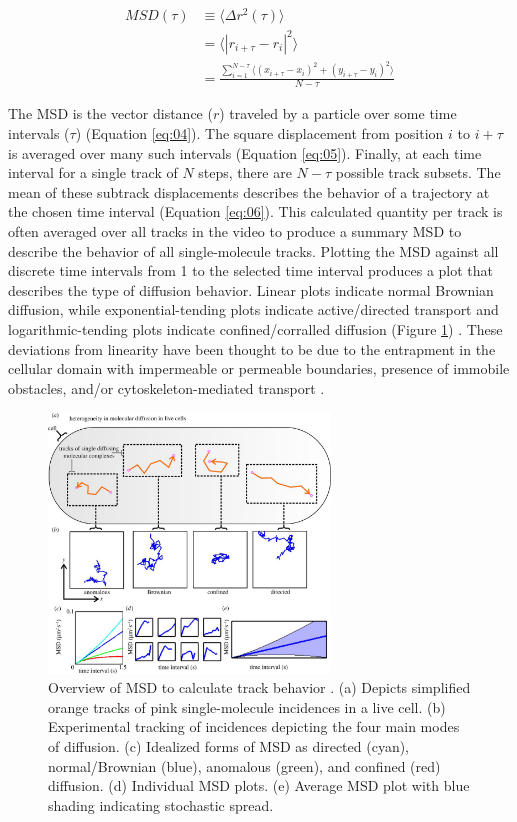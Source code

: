 \documentclass{bioinfo}
\begin{document}
\begin{align}
    MSD(\tau) & \equiv \Big \langle \Delta r^2(\tau) \Big \rangle \label{eq:04} \\ 
    & =  \Big \langle |r_{i+\tau} - r_i|^2 \Big \rangle \label{eq:05} \\ 
    & = \frac{\sum_{i=1}^{N-\tau}\big \langle (x_{i+\tau} - x_i)^2  + (y_{i+\tau} - y_i)^2 \big \rangle}{N - \tau} \label{eq:06}
\end{align}

The MSD is the vector distance ($r$) traveled by a particle over some time intervals ($\tau$) (Equation \ref{eq:04}). The square displacement from position $i$ to $i+\tau$ is averaged over many such intervals (Equation \ref{eq:05}). Finally, at each time interval for a single track of $N$ steps, there are $N-\tau$ possible track subsets. The mean of these subtrack displacements describes the behavior of a trajectory at the chosen time interval (Equation \ref{eq:06}). This calculated quantity per track is often averaged over all tracks in the video to produce a summary MSD to describe the behavior of all single-molecule tracks. Plotting the MSD against all discrete time intervals from 1 to the selected time interval produces a plot that describes the type of diffusion behavior. Linear plots indicate normal Brownian diffusion, while exponential-tending plots indicate active/directed transport and logarithmic-tending plots indicate confined/corralled diffusion (Figure \ref{fig:09}) \citep{Monnier}. These deviations from linearity have been thought to be due to the entrapment in the cellular domain with impermeable or permeable boundaries, presence of immobile obstacles, and/or cytoskeleton-mediated transport \citep{Vrljic}.

\begin{figure}[!tpb]
\centerline{\includegraphics[width=75mm]{MSD.jpg}}
\caption{Overview of MSD to calculate track behavior \citep{Robson}. (a) Depicts simplified orange tracks of pink single-molecule incidences in a live cell. (b) Experimental tracking of incidences depicting the four main modes of diffusion. (c) Idealized forms of MSD as directed (cyan), normal/Brownian (blue), anomalous (green), and confined (red) diffusion. (d) Individual MSD plots. (e) Average MSD plot with blue shading indicating stochastic spread.}\label{fig:09}
\end{figure}
\end{document}
